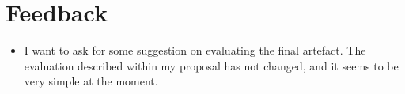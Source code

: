 \chapter*{Feedback}\label{C:feedback} 


\begin{itemize}
    \item I want to ask for some suggestion on evaluating the final artefact. The evaluation described within my proposal has not changed, and it seems to be very simple at the moment.   
\end{itemize}
